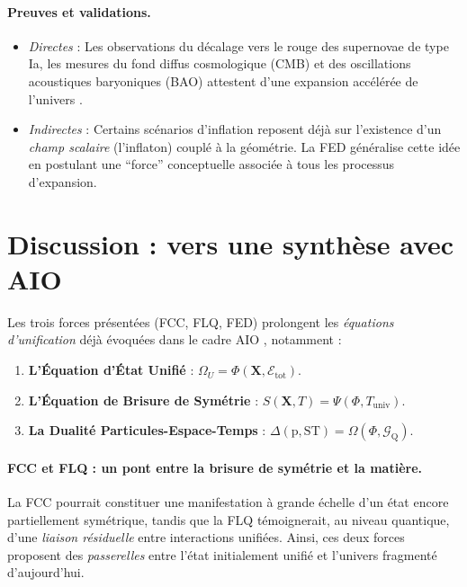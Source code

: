 \documentclass[12pt]{article}
\begin{document}
\paragraph{Preuves et validations.}
\begin{itemize}
    \item \emph{Directes} : Les observations du décalage vers le rouge des supernovae 
          de type Ia, les mesures du fond diffus cosmologique (CMB) et des oscillations 
          acoustiques baryoniques (BAO) attestent d'une expansion accélérée de l'univers 
          \cite{planck2020parameters}.
    \item \emph{Indirectes} : Certains scénarios d'inflation reposent déjà sur 
          l'existence d'un \emph{champ scalaire} (l'inflaton) couplé à la géométrie. 
          La FED généralise cette idée en postulant une ``force'' conceptuelle associée 
          à tous les processus d'expansion.
\end{itemize}

\section{Discussion : vers une synthèse avec AIO}

Les trois forces présentées (FCC, FLQ, FED) prolongent les \emph{équations d'unification} 
déjà évoquées dans le cadre AIO \cite{weinberg1995quantum, rovelli2004quantum}, 
notamment :
\begin{enumerate}
    \item \textbf{L'Équation d'État Unifié} : 
          \(\Omega_U = \Phi(\mathbf{X}, \mathcal{E}_{\mathrm{tot}})\).
    \item \textbf{L'Équation de Brisure de Symétrie} : 
          \(S(\mathbf{X}, T) = \Psi(\Phi, T_{\mathrm{univ}})\).
    \item \textbf{La Dualité Particules-Espace-Temps} : 
          \(\Delta(\mathrm{p}, \mathrm{ST}) = \Omega(\Phi, \mathcal{G}_{\mathrm{Q}})\).
\end{enumerate}

\paragraph{FCC et FLQ : un pont entre la brisure de symétrie et la matière.}
La FCC pourrait constituer une manifestation à grande échelle d'un état encore partiellement 
symétrique, tandis que la FLQ témoignerait, au niveau quantique, d'une \emph{liaison résiduelle} 
entre interactions unifiées. Ainsi, ces deux forces proposent des \emph{passerelles} 
entre l'état initialement unifié et l'univers fragmenté d'aujourd'hui.
\end{document}

